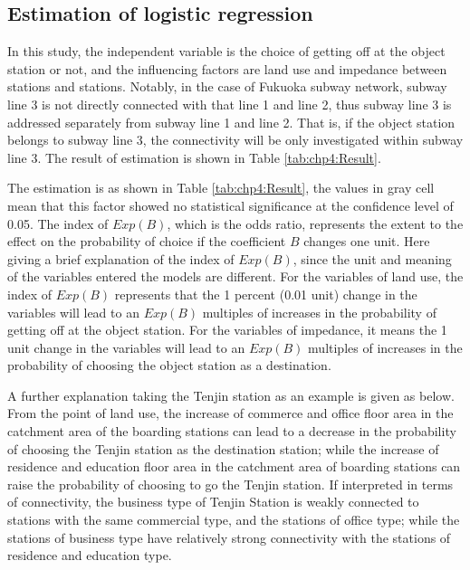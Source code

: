 \subsection{Estimation of logistic regression}
%
In this study, the independent variable is the choice of getting off at the object station or not, and the influencing factors are land use and impedance between stations and stations. Notably, in the case of Fukuoka subway network, subway line 3 is not directly connected with that line 1 and line 2, thus subway line 3 is addressed separately from subway line 1 and line 2. That is, if the object station belongs to subway line 3, the connectivity will be only investigated within subway line 3. The result of estimation is shown in Table \ref{tab:chp4:Result}.

%
The estimation is as shown in Table \ref{tab:chp4:Result}, the values in gray cell mean that this factor showed no statistical significance at the confidence level of 0.05. The index of $Exp(B)$, which is the odds ratio, represents the extent to the effect on the probability of choice if the coefficient $B$ changes one unit. Here giving a brief explanation of the index of $Exp(B)$, since the unit and meaning of the variables entered the models are different. For the variables of land use, the index of $Exp(B)$ represents that the 1 percent (0.01 unit) change in the variables will lead to an $Exp(B)$ multiples of increases in the probability of getting off at the object station. For the variables of impedance, it means the 1 unit change in the variables will lead to an $Exp(B)$ multiples of increases in the probability of choosing the object station as a destination. 

%
A further explanation taking the Tenjin station as an example is given as below. From the point of land use, the increase of commerce and office floor area in the catchment area of the boarding stations can lead to a decrease in the probability of choosing the Tenjin station as the destination station; while the increase of residence and education floor area in the catchment area of boarding stations can raise the probability of choosing to go the Tenjin station. If interpreted in terms of connectivity, the business type of Tenjin Station is weakly connected to stations with the same commercial type, and the stations of office type; while the stations of business type have relatively strong connectivity with the stations of residence and education type. 

%
